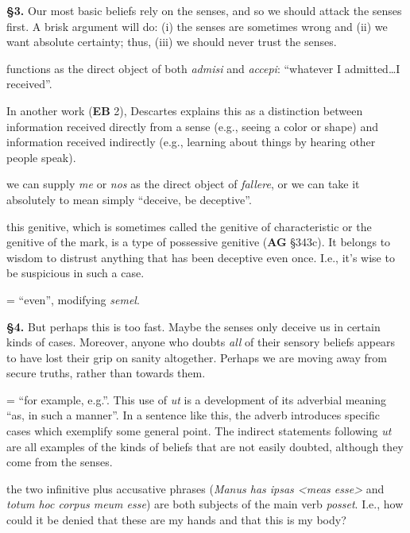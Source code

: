 \prenotes

\textbf{§3.} Our most basic beliefs rely on the senses, and so we should attack the senses first. A brisk argument will do: (i) the senses are sometimes wrong and (ii) we want absolute certainty; thus, (iii) we should never trust the senses.

 functions as the direct object of both \textit{admisi} and \textit{accepi}: ``whatever I admitted\dots I received''.

 In another work (\textbf{EB} 2), Descartes explains this as a distinction between information received directly from a sense (e.g., seeing a color or shape) and information received indirectly (e.g., learning about things by hearing other people speak).

 we can supply \textit{me} or \textit{nos} as the direct object of \textit{fallere}, or we can take it absolutely to mean simply ``deceive, be deceptive''.

 this genitive, which is sometimes called the genitive of characteristic or the genitive of the mark, is a type of possessive genitive (\textbf{AG} §343c). It belongs to wisdom to distrust anything that has been deceptive even once. I.e., it's wise to be suspicious in such a case.

 = ``even'', modifying \textit{semel}.

\textbf{§4.} But perhaps this is too fast. Maybe the senses only deceive us in certain kinds of cases. Moreover, anyone who doubts \textit{all} of their sensory beliefs appears to have lost their grip on sanity altogether. Perhaps we are moving away from secure truths, rather than towards them. 

 = ``for example, e.g.''. This use of \textit{ut} is a development of its adverbial meaning ``as, in such a manner''. In a sentence like this, the adverb introduces specific cases which exemplify some general point. The indirect statements following \textit{ut} are all examples of the kinds of beliefs that are not easily doubted, although they come from the senses.

 the two infinitive plus accusative phrases (\textit{Manus has ipsas <meas esse>} and \textit{totum hoc corpus meum esse}) are both subjects of the main verb \textit{posset}. I.e., how could it be denied that these are my hands and that this is my body?

